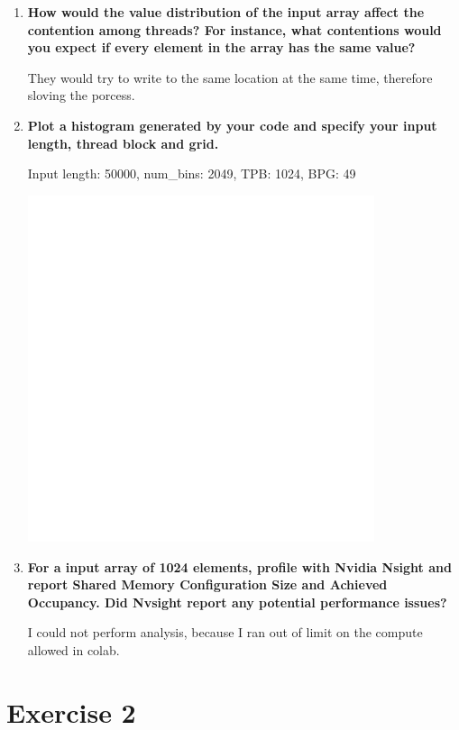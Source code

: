 \documentclass[a4paper,11pt]{scrartcl}
\begin{document}
\begin{enumerate}
    \item \textbf{How would the value distribution of the input array affect the contention among threads? For instance, what contentions would you expect if every element in the array has the same value? }

    They would try to write to the same location at the same time, therefore sloving the porcess.

    \item \textbf{Plot a histogram generated by your code and specify your input length, thread block and grid.}

        Input length: 50000, num\_bins: 2049, TPB: 1024, BPG: 49

\includegraphics*[width=0.8\textwidth]{images/hist.png}


    \item \textbf{For a input array of 1024 elements, profile with Nvidia Nsight and report Shared Memory Configuration Size and Achieved Occupancy. Did Nvsight report any potential performance issues?}

    I could not perform analysis, because I ran out of limit on the compute allowed in colab.

\end{enumerate}



\section*{Exercise 2}
\end{document}
